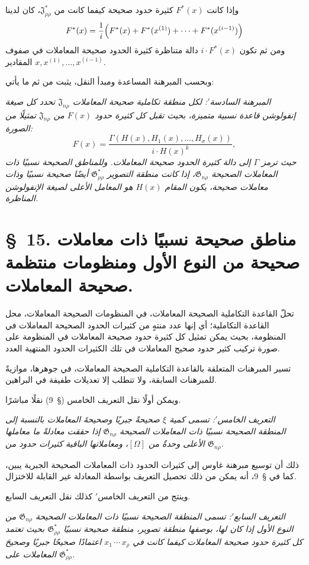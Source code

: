 \documentclass[11pt]{article}
\providecommand{\Jdom}{\mathfrak{J}}
\providecommand{\Gdom}{\mathfrak{G}}
\providecommand{\rcdots}{\,\cdots\,}
\begin{document}
وإذا كانت $F^*(x)$ كثيرة حدود صحيحة كيفما كانت من $\Jdom^*_{\rho\rho}$، كان لدينا
\[
  F^*(x)=\frac1i\Bigl(F^*(x)+F^*(x^{(1)})+\cdots+F^*(x^{(i-1)})\Bigr)
\]
ومن ثم تكون $i\cdot F^*(x)$ دالة متناظرة كثيرة الحدود صحيحة المعاملات في صفوف المقادير $x,x^{(1)},\ldots,x^{(i-1)}$.

وبحسب المبرهنة المساعدة ومبدأ النقل، يثبت من ثم ما يأتي:

\emph{المبرهنة السادسة$'$: لكل منطقة تكاملية صحيحة المعاملات $\Jdom_{n\rho}$ تحدد كل صيغة إنفولوشن قاعدة نسبية متميزة، بحيث تقبل كل كثيرة حدود $F(x)$ من $\Jdom_{n\rho}$ تمثيلًا من الصورة:}
\[
  F(x)=\frac{\Gamma(H(x),H_1(x),\ldots,H_\sigma(x))}{i\cdot H(x)^k},
\]
\emph{حيث ترمز $\Gamma$ إلى دالة كثيرة الحدود صحيحة المعاملات. وللمناطق الصحيحة نسبيًا ذات المعاملات الصحيحة $\Gdom_{n\rho}$، إذا كانت منطقة التصوير $\Gdom^*_{\rho\rho}$ أيضًا صحيحة نسبيًا وذات معاملات صحيحة، يكون المقام $H(x)$ هو المعامل الأعلى لصيغة الإنفولوشن المناظرة.}

\section*{\S\ 15. مناطق صحيحة نسبيًا ذات معاملات صحيحة من النوع الأول ومنظومات منتظمة صحيحة المعاملات.}

تحلّ القاعدة التكاملية الصحيحة المعاملات، في المنظومات الصحيحة المعاملات، محل القاعدة التكاملية؛ أي إنها عدد منتهٍ من كثيرات الحدود الصحيحة المعاملات في المنظومة، بحيث يمكن تمثيل كل كثيرة حدود صحيحة المعاملات في المنظومة على صورة تركيب كثير حدود صحيح المعاملات في تلك الكثيرات الحدود المنتهية العدد.

تسير المبرهنات المتعلقة بالقاعدة التكاملية الصحيحة المعاملات، في جوهرها، موازيةً للمبرهنات السابقة، ولا تتطلب إلا تعديلات طفيفة في البراهين.

ويمكن أولًا نقل التعريف الخامس (\S\ 9) نقلًا مباشرًا.

\emph{التعريف الخامس$'$: تسمى كمية $\xi$ صحيحةً جبريًا وصحيحةَ المعاملات بالنسبة إلى المنطقة الصحيحة نسبيًا ذات المعاملات الصحيحة $\Gdom_{n\rho}$ إذا حققت معادلةً ما معاملها الأعلى وحدةٌ من $[\Omega]$، ومعاملاتها الباقية كثيرات حدود من $\Gdom_{n\rho}$.}

ذلك أن توسيع مبرهنة غاوس إلى كثيرات الحدود ذات المعاملات الصحيحة الجبرية يبين، كما في \S\ 9، أنه يمكن من ذلك تحصيل التعريف بواسطة المعادلة غير القابلة للاختزال.

وينتج من التعريف الخامس$'$ كذلك نقل التعريف السابع.

\emph{التعريف السابع$'$: تسمى المنطقة الصحيحة نسبيًا ذات المعاملات الصحيحة $\Gdom_{n\rho}$ من النوع الأول إذا كان لها، بوصفها منطقة تصوير، منطقة صحيحة نسبيًا $\Gdom^*_{\rho\rho}$ بحيث تعتمد كل كثيرة حدود صحيحة المعاملات كيفما كانت في $x_1\rcdots x_\rho$ اعتمادًا صحيحًا جبريًا وصحيحَ المعاملات على $\Gdom^*_{\rho\rho}$.}
\end{document}
